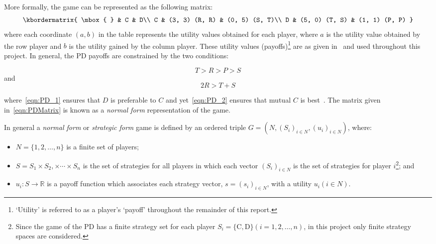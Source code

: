 More formally, the game can be represented as the following matrix:
\begin{equation}
    \kbordermatrix{
        \mbox{ } & C & D\\ 
        C & (3, 3) (R, R) & (0, 5) (S, T)\\ 
        D & (5, 0) (T, S) & (1, 1) (P, P)
    }
\end{equation}\label{eqn:PDMatrix}
where each coordinate \((a, b)\) in the table represents the utility values
obtained for each player, where \(a\) is the utility value obtained by the row
player and \(b\) is the utility gained by the column player. These utility
values (payoffs)\footnote{`Utility' is referred to as a player's `payoff'
throughout the remainder of this report.} are as given
in~\cite{axelrod1980effective} and
used throughout this project. In general, the PD payoffs are constrained by the
two conditions:

\begin{equation}
    T > R > P > S
\end{equation}\label{eqn:PD_1}
and
\begin{equation}
    2R > T + S
\end{equation}\label{eqn:PD_2}

where~\eqref{eqn:PD_1} ensures that \(D\) is preferable to \(C\) and
yet~\eqref{eqn:PD_2} ensures that mutual \(C\) is
best~\cite{Knight2019,Press2012}. The matrix given in~\eqref{eqn:PDMatrix} is
known as a \textit{normal form} representation of the game.

\begin{definition}
    In general a \textit{normal form} or \textit{strategic form} game is defined
    by an ordered triple \(G = (N, {(S_i)}_{i \in N}, {(u_i)}_{i \in N})\), where:
    \begin{itemize}
        \item \(N = \{1, 2,\ldots, n\} \) is a finite set of players;
        \item \(S = S_1 \times S_2, \times \cdots \times S_n\) is the set of
        strategies for all players in which each vector \({(S_i)}_{i \in N}\) is
        the set of strategies for player \(i\)\footnote{Since the game of the PD has a finite strategy set for each player \(S_i=\{\text{C},
        \text{D}\} (i = 1, 2, \ldots, n)\), in this project only finite
        strategy spaces are considered.}; and
        \item \(u_i : S \to \mathbb{R}\) is a payoff function which associates each
        strategy vector, \(s = {(s_i)}_{i \in N}\), with a utility
        \(u_i(i \in N)\).
    \end{itemize}
\end{definition}

